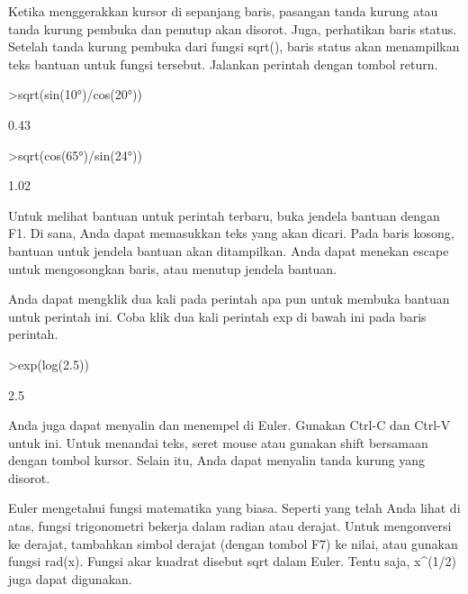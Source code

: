 \documentclass[a4paper,10pt]{article}
\begin{document}
\begin{eulernotebook}
\begin{eulercomment}
Ketika menggerakkan kursor di sepanjang baris, pasangan tanda kurung
atau tanda kurung pembuka dan penutup akan disorot. Juga, perhatikan
baris status. Setelah tanda kurung pembuka dari fungsi sqrt(), baris
status akan menampilkan teks bantuan untuk fungsi tersebut. Jalankan
perintah dengan tombol return.
\end{eulercomment}
\begin{eulerprompt}
>sqrt(sin(10°)/cos(20°))
\end{eulerprompt}
\begin{euleroutput}
         0.43 
\end{euleroutput}
\begin{eulerprompt}
>sqrt(cos(65°)/sin(24°))
\end{eulerprompt}
\begin{euleroutput}
         1.02 
\end{euleroutput}
\begin{eulercomment}
Untuk melihat bantuan untuk perintah terbaru, buka jendela bantuan
dengan F1. Di sana, Anda dapat memasukkan teks yang akan dicari. Pada
baris kosong, bantuan untuk jendela bantuan akan ditampilkan. Anda
dapat menekan escape untuk mengosongkan baris, atau menutup jendela
bantuan.

Anda dapat mengklik dua kali pada perintah apa pun untuk membuka
bantuan untuk perintah ini. Coba klik dua kali perintah exp di bawah
ini pada baris perintah.
\end{eulercomment}
\begin{eulerprompt}
>exp(log(2.5))
\end{eulerprompt}
\begin{euleroutput}
  2.5
\end{euleroutput}
\begin{eulercomment}
Anda juga dapat menyalin dan menempel di Euler. Gunakan Ctrl-C dan
Ctrl-V untuk ini. Untuk menandai teks, seret mouse atau gunakan shift
bersamaan dengan tombol kursor. Selain itu, Anda dapat menyalin tanda
kurung yang disorot.
\end{eulercomment}
\begin{eulercomment}

\end{eulercomment}
\begin{eulercomment}
Euler mengetahui fungsi matematika yang biasa. Seperti yang telah Anda
lihat di atas, fungsi trigonometri bekerja dalam radian atau derajat.
Untuk mengonversi ke derajat, tambahkan simbol derajat (dengan tombol
F7) ke nilai, atau gunakan fungsi rad(x). Fungsi akar kuadrat disebut
sqrt dalam Euler. Tentu saja, x\textasciicircum{}(1/2) juga dapat digunakan.


\end{eulercomment}
\end{eulernotebook}
\end{document}
